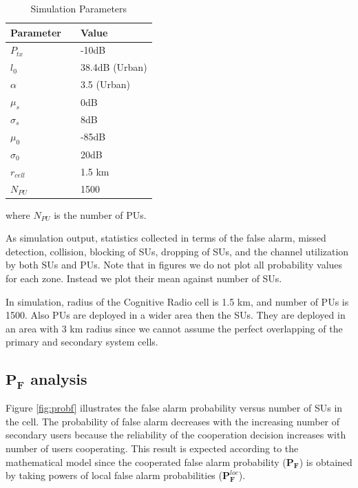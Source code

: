 \documentclass[conference,compsoc]{IEEEtran}
\newcommand{\probf}{\mathbf{P_F}}
\newcommand{\probflocal}{\mathbf{P}_\mathbf{F}^{loc}}
\newcommand{\CR}{Cognitive Radio }
\begin{document}
\begin{table}[!htb]
\renewcommand{\arraystretch}{1.2}
\caption{Simulation Parameters}
\label{tbl:sim_parameters}
\centering
\begin{tabular}{l c l}
  \hline
  Parameter & & Value\\
  \hline
  $P_{tx}$ & & -10dB \\
  $l_0$    & & 38.4dB (Urban) \\
  $\alpha$ & & 3.5 (Urban)\\
  $\mu_s$  & & 0dB\\
  $\sigma_s$ & & 8dB\\
  $\mu_0$  & & -85dB \\
  $\sigma_0$ & & 20dB \\
  $r_{cell}$ & & 1.5 km\\
  $N_{PU}$ & & 1500\\
  \hline
\end{tabular}
\end{table}
where $N_{PU}$ is the number of PUs.

As simulation output, statistics collected in terms of the false alarm, missed detection, collision, blocking of SUs, dropping of SUs, and the channel utilization by both SUs and PUs. Note that in figures we do not plot all probability values for each zone. Instead we plot their mean against number of SUs.

In simulation, radius of the \CR cell is 1.5 km, and number of PUs is 1500. Also PUs are deployed in a wider area then the SUs. They are deployed in an area with 3 km radius since we cannot assume the perfect overlapping of the primary and secondary system cells.

\subsection{$\probf$ analysis}
Figure \ref{fig:probf} illustrates the false alarm probability versus number of SUs in the cell. The probability of false alarm decreases with the increasing number of secondary users because the reliability of the cooperation decision increases with number of users cooperating. This result is expected according to the mathematical model since the cooperated false alarm probability ($\probf$) is obtained by taking powers of local false alarm probabilities ($\probflocal$).
\end{document}
